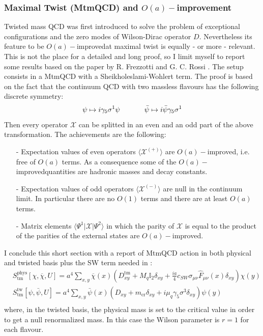 \documentclass[english, LaM, oneside, noexaminfo]{sapthesis}
\newcommand{\la}{\langle}
\newcommand{\ra}{\rangle}
\newcommand{\oaid}{$O(a)-$improved}
\newcommand{\oait}{$O(a)-$improvement}
\begin{document}
\subsubsection*{Maximal Twist (MtmQCD) and \oait}
\noindent
Twisted mass QCD was first introduced to solve the problem of exceptional configurations and the zero modes of Wilson-Dirac operator $D$.
Nevertheless its feature to be \oaid\space at maximal twist is equally - or more - relevant.
\newline
This is not the place for a detailed and long proof, so I limit myself to report some results based on the paper by R. Frezzotti and G. C. Rossi \cite{FR1}.
The setup consists in a MtmQCD with a Sheikholeslami-Wohlert term.
The proof is based on the fact that the continuum QCD with two massless flavours has the following discrete symmetry:
\begin{equation*}
    \psi \mapsto i\gamma_5 \sigma^1 \psi
    \hspace*{1.2cm}
    \bar \psi \mapsto i \bar \psi \gamma_5 \sigma^1
\end{equation*}
Then every operator $\mathcal{X}$ can be splitted in an even and an odd part of the above transformation.
The achievements are the following:
\begin{itemize}
    \item [-] Expectation values of even operators $\la\mathcal{X}^{(+)}\ra$ are \oaid, i.e. free of $O(a)$ terms.
        As a consequence some of the \oaid\space quantities are hadronic masses and decay constants.
    \item [-] Expectation values of odd operators $\la\mathcal{X}^{(-)}\ra$ are null in the continuum limit.
        In particular there are no $O(1)$ terms and there are at least $O(a)$ terms.
    \item [-] Matrix elements $\la \Psi^1 | \mathcal{X} | \Psi^2 \ra$ in which the parity of $\mathcal{X}$ is equal to the product of the parities of the external states are \oaid.
\end{itemize}
I conclude this short section with a report of MtmQCD action in both physical and twisted basis plus the SW term needed in \cite{FR1}:
\begin{equation*}
    \begin{aligned}
        & S^\text{phys}_\text{tm} [\chi,\overline{\chi},U] = a^4 \sum_{x,y} \overline{\chi} (x) \left( D_{xy}^\text{tm} + M_q \mathbb{I}_2 \delta_{xy} + \frac{ia}{4}c_{SW}\sigma_{\mu\nu}\hat F_{\mu\nu} (x) \delta_{xy} \right) \chi (y) \\
        & S^\text{tw}_\text{tm}[\psi,\bar \psi, U] = a^4 \sum_{x,y} \bar \psi(x) \left( D_{xy} + m_\text{cr} \delta_{xy} + i \mu_q \gamma_5 \sigma^3 \delta_{xy} \right) \psi (y)  \\
    \end{aligned}
\end{equation*}
where, in the twisted basis, the physical mass is set to the critical value in order to get a null renormalized mass.
In this case the Wilson parameter is $r=1$ for each flavour.
\end{document}
